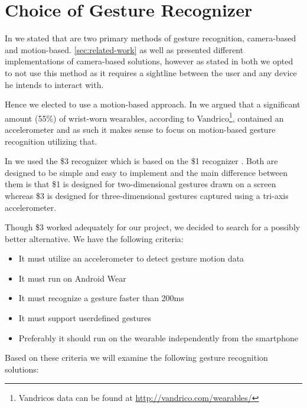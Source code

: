 \section{Choice of Gesture Recognizer}
\label{sec:analysis:choice-of-gesture-recognizer}

In \cite{prespecialisation} we stated that are two primary methods of gesture recognition, camera-based and motion-based.
\cref{sec:related-work} as well as \cite{prespecialisation} presented different implementations of camera-based solutions, however as stated in both we opted to not use this method as it requires a sightline between the user and any device he intends to interact with.

Hence we elected to use a motion-based approach.
In \cite{prespecialisation} we argued that a significant amount (55\%) of wrist-worn wearables, according to Vandrico\footnote{Vandricos data can be found at \url{http://vandrico.com/wearables/}}, contained an accelerometer and as such it makes sense to focus on motion-based gesture recognition utilizing that.

In \cite{prespecialisation} we used the \$3 recognizer \cite{threedollar} which is based on the \$1 recognizer \cite{wobbrock2007gestures}.
Both are designed to be simple and easy to implement and the main difference between them is that \$1 is designed for two-dimensional gestures drawn on a screen whereas \$3 is designed for three-dimensional gestures captured using a tri-axis accelerometer.

Though \$3 worked adequately for our project, we decided to search for a possibly better alternative.
We have the following criteria:

\begin{itemize}
    \item It must utilize an accelerometer to detect gesture motion data
    \item It must run on Android Wear
    \item It must recognize a gesture faster than 200ms
    \item It must support userdefined gestures
    \item Preferably it should run on the wearable independently from the smartphone
\end{itemize}
Based on these criteria we will examine the following gesture recognition solutions:

